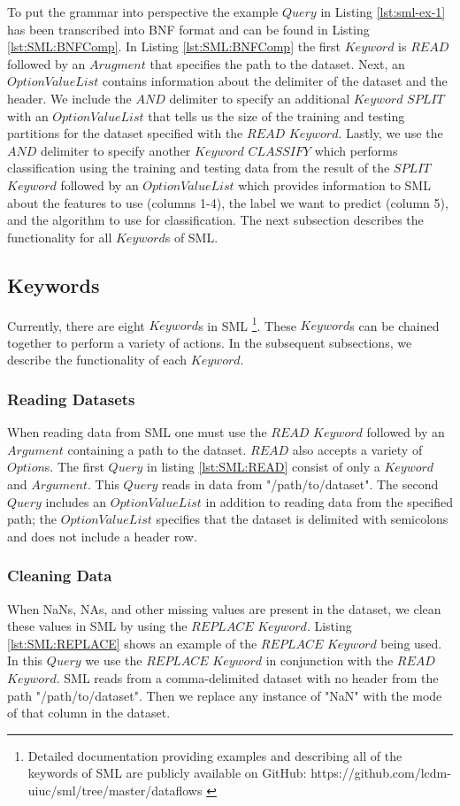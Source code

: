 To put the grammar into perspective the example \(Query\) in Listing \ref{lst:sml-ex-1} has been transcribed into BNF format and can be found in Listing \ref{lst:SML:BNFComp}. In  Listing \ref{lst:SML:BNFComp}  the first \(Keyword\) is \(READ\) followed by an \(Arugment\) that specifies the path to the dataset. Next, an \(OptionValueList\) contains information about the delimiter of the dataset and the header. We include the \(AND\) delimiter to specify an additional \(Keyword\) \(SPLIT\) with an \(OptionValueList\) that tells us the size of the training and testing partitions for the dataset specified with the \(READ\) \(Keyword\). Lastly,  we use the \(AND\) delimiter to specify another \(Keyword\) \(CLASSIFY\) which performs classification using the training and testing data from the result of the  \(SPLIT\) \(Keyword\) followed by an \(OptionValueList\) which provides information to SML about the features to use (columns 1-4), the label we want to predict (column 5), and the algorithm to use for classification. The next subsection describes the functionality for all \(Keyword\)s of SML.

\subsection{Keywords}
Currently, there are eight \(Keyword\)s in SML \footnote{Detailed documentation providing examples and describing all of the keywords of SML are publicly available on GitHub: https://github.com/lcdm-uiuc/sml/tree/master/dataflows \label{SML:Dataflow}}. These \(Keyword\)s can be chained together to perform a variety of actions. In the subsequent subsections, we describe the functionality of each \(Keyword\).

\subsubsection{Reading Datasets}
When reading data from SML one must use the \(READ\) \(Keyword\) followed by an \(Argument\) containing a path to the dataset. \(READ\) also accepts a variety of \(Option\)s. The first \(Query\) in listing \ref{lst:SML:READ} consist of only a \(Keyword\) and \(Argument\). This \(Query\) reads in data from "/path/to/dataset". The second \(Query\) includes an \(OptionValueList\) in addition to reading data from the specified path; the \(OptionValueList\) specifies that the dataset is delimited with semicolons and does not include a header row. 


\subsubsection{Cleaning Data}
When NaNs, NAs, and other missing values are present in the dataset, we clean these values in SML by using the \(REPLACE\) \(Keyword\).  Listing \ref{lst:SML:REPLACE}  shows an example of the \(REPLACE\) \(Keyword\) being used. In this \(Query\) we use the \(REPLACE\) \(Keyword\) in conjunction with the \(READ\) \(Keyword\).  SML reads from a comma-delimited dataset with no header from the path "/path/to/dataset". Then we replace any instance of "NaN" with the mode of that column in the dataset.



